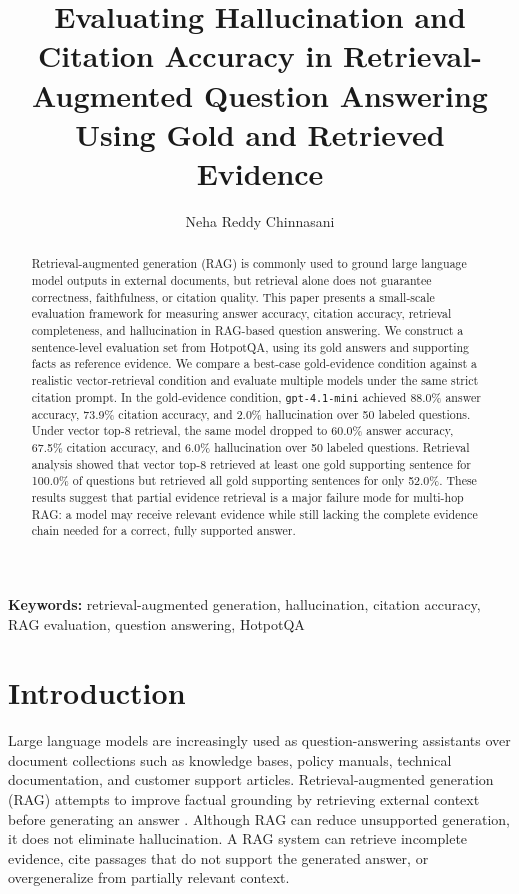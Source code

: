 \documentclass[10pt,twocolumn]{article}
\title{Evaluating Hallucination and Citation Accuracy in Retrieval-Augmented Question Answering Using Gold and Retrieved Evidence}
\author{Neha Reddy Chinnasani}
\date{}
\begin{document}
\maketitle

\begin{abstract}
Retrieval-augmented generation (RAG) is commonly used to ground large language model outputs in external documents, but retrieval alone does not guarantee correctness, faithfulness, or citation quality. This paper presents a small-scale evaluation framework for measuring answer accuracy, citation accuracy, retrieval completeness, and hallucination in RAG-based question answering. We construct a sentence-level evaluation set from HotpotQA, using its gold answers and supporting facts as reference evidence. We compare a best-case gold-evidence condition against a realistic vector-retrieval condition and evaluate multiple models under the same strict citation prompt. In the gold-evidence condition, \texttt{gpt-4.1-mini} achieved 88.0\% answer accuracy, 73.9\% citation accuracy, and 2.0\% hallucination over 50 labeled questions. Under vector top-8 retrieval, the same model dropped to 60.0\% answer accuracy, 67.5\% citation accuracy, and 6.0\% hallucination over 50 labeled questions. Retrieval analysis showed that vector top-8 retrieved at least one gold supporting sentence for 100.0\% of questions but retrieved all gold supporting sentences for only 52.0\%. These results suggest that partial evidence retrieval is a major failure mode for multi-hop RAG: a model may receive relevant evidence while still lacking the complete evidence chain needed for a correct, fully supported answer.
\end{abstract}

\noindent\textbf{Keywords:} retrieval-augmented generation, hallucination, citation accuracy, RAG evaluation, question answering, HotpotQA

\section{Introduction}

Large language models are increasingly used as question-answering assistants over document collections such as knowledge bases, policy manuals, technical documentation, and customer support articles. Retrieval-augmented generation (RAG) attempts to improve factual grounding by retrieving external context before generating an answer \citep{lewis2020rag}. Although RAG can reduce unsupported generation, it does not eliminate hallucination. A RAG system can retrieve incomplete evidence, cite passages that do not support the generated answer, or overgeneralize from partially relevant context.
\end{document}
